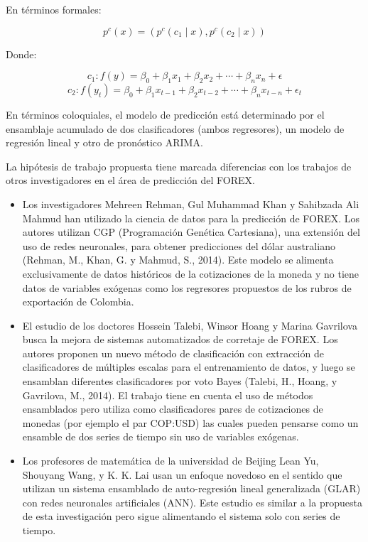 En términos formales:

\[ p^{c}(x) = (p^{c}(c_{1} \mid x),p^{c}(c_{2} \mid x)) \]

Donde:

\[ c_{1} : f(y) = \beta_{0} + \beta_{1}x_{1} + \beta_{2}x_{2} + \cdots + \beta_{n}x_{n} + \epsilon \]
\[ c_{2} : f(y_{t}) = \beta_{0} + \beta_{1}x_{t-1} + \beta_{2}x_{t-2} + \cdots + \beta_{n}x_{t-n} + \epsilon_{t}\]

En términos coloquiales, el modelo de predicción está determinado por el ensamblaje acumulado de dos clasificadores (ambos regresores), un modelo de regresión lineal y otro de pronóstico ARIMA.

La hipótesis de trabajo propuesta tiene marcada diferencias con los trabajos de otros investigadores en el área de predicción del FOREX. 

\begin{itemize}
\item Los investigadores Mehreen Rehman, Gul Muhammad Khan y Sahibzada Ali Mahmud han utilizado la ciencia de datos para la predicción de FOREX. Los autores utilizan CGP (Programación Genética Cartesiana), una extensión del uso de redes neuronales, para obtener predicciones del dólar australiano (Rehman, M., Khan, G. y Mahmud, S., 2014). Este modelo se alimenta exclusivamente de datos históricos de la cotizaciones de la moneda y no tiene datos de variables exógenas como los regresores propuestos de los rubros de exportación de Colombia. 
\item El estudio de los doctores Hossein Talebi, Winsor Hoang y Marina Gavrilova busca la mejora de sistemas automatizados de corretaje de FOREX. Los autores proponen un nuevo método de clasificación con extracción de clasificadores de múltiples escalas para el entrenamiento de datos, y luego se ensamblan diferentes clasificadores por voto Bayes (Talebi, H., Hoang, y Gavrilova, M., 2014). El trabajo tiene en cuenta el uso de métodos ensamblados pero utiliza como clasificadores pares de cotizaciones de monedas (por ejemplo el par COP:USD) las cuales pueden pensarse como un ensamble de dos series de tiempo sin uso de variables exógenas. 
\item Los profesores de matemática de la universidad de Beijing Lean Yu, Shouyang Wang, y K. K. Lai usan un enfoque novedoso en el sentido que utilizan un sistema ensamblado de auto-regresión lineal generalizada (GLAR) con redes neuronales artificiales (ANN). Este estudio es similar a la propuesta de esta investigación pero sigue alimentando el sistema solo con series de tiempo.  
\end{itemize}

